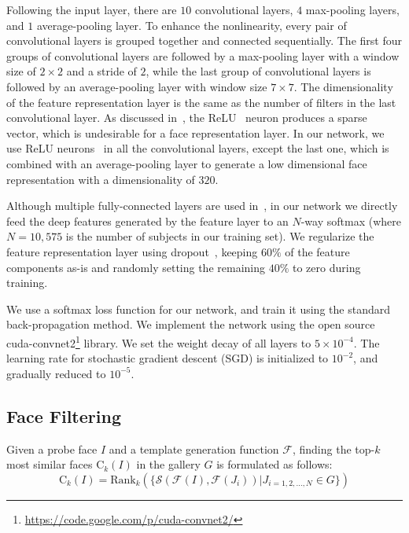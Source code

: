 \documentclass[10pt,journal,compsoc]{IEEEtran}
\begin{document}
Following the input layer, there are $10$ convolutional layers, $4$ max-pooling layers, and $1$ average-pooling layer. To enhance the nonlinearity, every pair of convolutional layers is grouped together and connected sequentially. The first four groups of convolutional layers are followed by a max-pooling layer with a window size of $2\times2$ and a stride of $2$, while the last group of convolutional layers is followed by an average-pooling layer with window size $7\times7$. The dimensionality of the feature representation layer is the same as the number of filters in the last convolutional layer. As discussed in~\cite{DB:CASIA}, the ReLU~\cite{dl:alex2012} neuron produces a sparse vector, which is undesirable for a face representation layer. In our network, we use ReLU neurons~\cite{dl:alex2012} in all the convolutional layers, except the last one, which is combined with an average-pooling layer to generate a low dimensional face representation with a dimensionality of $320$.

Although multiple fully-connected layers are used in~\cite{dl:alex2012, self:wan2014}, in our network we directly feed the deep features generated by the feature layer to an $N$-way softmax (where $N=10,575$ is the number of subjects in our training set). We regularize the feature representation layer using dropout~\cite{dl:dropout}, keeping $60\%$ of the feature components as-is and randomly setting the remaining $40\%$ to zero during training.



We use a softmax loss function for our network, and train it using the standard back-propagation method. We implement the network using the open source cuda-convnet2\footnote{\url{https://code.google.com/p/cuda-convnet2/}} library. We set the weight decay of all layers to $5 \times 10^{-4}$. The learning rate for stochastic gradient descent (SGD) is initialized to $10^{-2}$, and gradually reduced to $10^{-5}$.

\subsection{Face Filtering}
Given a probe face $I$ and a template generation function $\mathcal{F}$, finding the top-$k$ most similar faces $\mathrm{C}_k(I)$ in the gallery $G$ is formulated as follows:
\begin{equation}
\mathrm{C}_k(I) = \mathrm{Rank}_k(\{ \mathcal{S}(\mathcal{F}(I), \mathcal{F}(J_i)) | J_{i=1, 2, \ldots, N} \in G \})
\end{equation}
\end{document}
